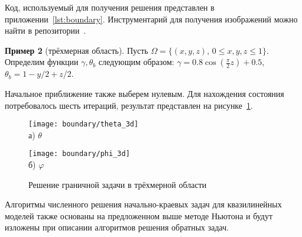 Код, используемый для получения решения представлен в приложении~\ref{lst:boundary}.
Инструментарий для получения изображений можно найти в репозитории~\cite{mesenev-github}.

\textbf{Пример 2} (трёхмерная область).
Пусть $\Omega=\{(x,y,z),\, 0 \leq x,y,z \leq 1 \}$.
Определим функции $\gamma, \theta_b$ следующим образом:
$\gamma = 0.8 \cos\left(\frac{\pi}{2} z\right) + 0.5$,
$\theta_b = 1- y / 2 + z /2$.

Начальное приближение также выберем нулевым.
Для нахождения состояния потребовалось шесть итераций,
результат представлен на рисунке~\ref{fig:4_1:boundary_3d}.
\begin{figure}[h!t]
    \begin{minipage}[b][][b]{0.49\linewidth}
        \centering
        \texttt{[image: boundary/theta\_3d]} \\ а) $\theta$
    \end{minipage}
    \hfill
    \begin{minipage}[b][][b]{0.49\linewidth}
        \centering
        \texttt{[image: boundary/phi\_3d]} \\ б) $\varphi$
    \end{minipage}
    \caption{Решение граничной задачи в трёхмерной области}
    \label{fig:4_1:boundary_3d}
\end{figure}

\begin{remark}
    Алгоритмы численного решения начально-краевых задач для квазилинейных моделей
    также основаны на предложенном выше методе Ньютона и будут изложены при описании
    алгоритмов решения обратных задач.
\end{remark}
